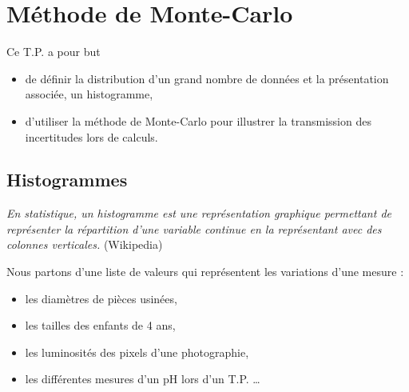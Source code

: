 \chapter{Méthode de Monte-Carlo}
\thispagestyle{empty}
\vskip -1cm
{\sf Ce T.P. a pour but 
\begin{itemize}
    \item de définir la distribution d'un grand nombre de données et la présentation associée,  un histogramme,
    \item d'utiliser la méthode de Monte-Carlo pour illustrer la transmission des incertitudes lors de calculs.
\end{itemize}
}
\section{Histogrammes}
{\it En statistique, un histogramme est une représentation graphique permettant de représenter la répartition d'une variable continue en la représentant avec des colonnes verticales. } (Wikipedia)

Nous partons d'une liste de valeurs qui représentent les variations d'une mesure :
\begin{itemize}
    \item les diamètres de pièces usinées,
    \item les tailles des enfants de 4 ans,
    \item les luminosités des pixels d'une photographie,
    \item les différentes mesures d'un pH lors d'un T.P. \dots
\end{itemize}
